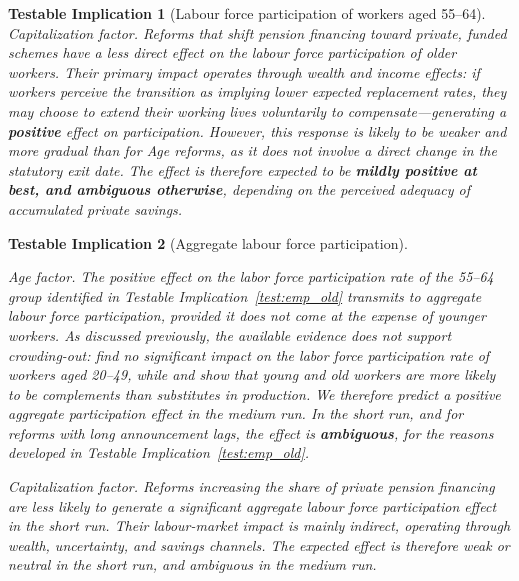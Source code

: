 \documentclass[11pt,english,a4paper, twoside, authoryear]{article}
\newtheorem{testable}{Testable Implication}}
\begin{document}
\begin{testable}[Labour force participation of workers aged 55--64]
\textit{Capitalization factor.} Reforms that shift pension financing toward private, funded schemes have a less direct effect on the labour force participation of older workers. Their primary impact operates through wealth and income effects: if workers perceive the transition as implying lower expected replacement rates, they may choose to extend their working lives voluntarily to compensate---generating a \textbf{positive} effect on participation. However, this response is likely to be weaker and more gradual than for Age reforms, as it does not involve a direct change in the statutory exit date. The effect is therefore expected to be \textbf{mildly positive at best, and ambiguous otherwise}, depending on the perceived adequacy of accumulated private savings.
\end{testable}

\begin{testable}[Aggregate labour force participation]\label{test:emp_agg}

\textit{Age factor.} The positive effect on the labor force participation rate of the 55--64 group identified in Testable Implication~\ref{test:emp_old} transmits to aggregate labour force participation, provided it does not come at the expense of younger workers. As discussed previously, the available evidence does not support crowding-out: \citet{BiZubairy2023} find no significant impact on the labor force participation rate of workers aged 20--49, while \citet{MunnellWu2012} and \citet{Dai2022} show that young and old workers are more likely to be complements than substitutes in production. We therefore predict a positive aggregate participation effect in the medium run. In the short run, and for reforms with long announcement lags, the effect is \textbf{ambiguous}, for the reasons developed in Testable Implication~\ref{test:emp_old}.

\textit{Capitalization factor.} Reforms increasing the share of private pension financing are less likely to generate a significant aggregate labour force participation effect in the short run. Their labour-market impact is mainly indirect, operating through wealth, uncertainty, and savings channels. The expected effect is therefore weak or neutral in the short run, and ambiguous in the medium run.
\end{testable}
\end{document}

